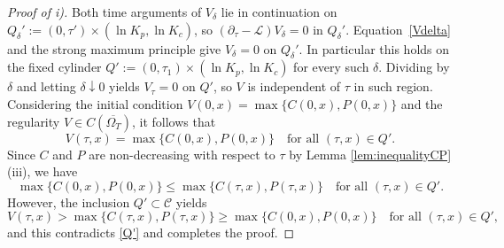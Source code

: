 \documentclass[11pt, a4paper, leqno]{amsart}
\numberwithin{equation}{section}
\theoremstyle{plain}
\theoremstyle{definition}
\theoremstyle{remark}
\def\le{\leqslant}
\def\ge{\geqslant}
\begin{document}
\begin{proof}[Proof of i)]
Both time arguments of $V_\delta$ lie in continuation on
$Q_\delta':=(0,\tau')\times(\ln K_p,\ln K_c)$, so
$(\partial_\tau-\mathcal L)V_\delta=0$ in $Q_\delta'$. Equation~\eqref{Vdelta}
and the strong maximum principle give $V_\delta=0$ on $Q_\delta'$.
In particular this holds on the fixed cylinder
$Q':=(0,\tau_1)\times(\ln K_p,\ln K_c)$ for every such $\delta$.
Dividing by $\delta$ and letting $\delta\downarrow0$ yields
$V_\tau=0$ on $Q'$, so $V$ is independent of $\tau$ in such region.
Considering the initial condition $V(0,x) = \max\{C(0,x), P(0,x)\}$ and the regularity $V \in C(\overline{\Omega_T})$, it follows that
\begin{equation}\label{Q'}
    V(\tau,x) = \max\{C(0,x), P(0,x)\} \quad \text{for all } (\tau,x) \in Q'.
\end{equation}
Since $C$ and $P$ are non-decreasing with respect to $\tau$ by Lemma \ref{lem:inequalityCP} (iii), we have
\[ 
\max\{C(0,x), P(0,x)\} \le \max\{C(\tau,x), P(\tau,x)\} \quad \text{for all } (\tau,x) \in Q'. 
\]
However, the inclusion $Q' \subset \mathcal{C}$ yields
\[ 
V(\tau,x) > \max\{C(\tau,x), P(\tau,x)\} \ge \max\{C(0,x), P(0,x)\} \quad \text{for all } (\tau,x) \in Q', 
\]
and this contradicts \eqref{Q'} and completes the proof.
\end{proof}
\end{document}
